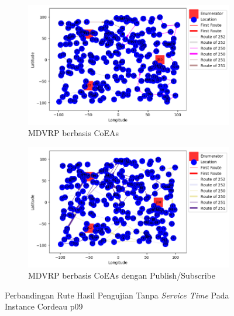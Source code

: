 \begin{figure}[H]
	\centering
	\begin{subfigure}[t]{\textwidth}
		\centering
		\includegraphics[width=\textwidth]{Resources/Images/cordeau_p09/cordeau_p09_notw_coes}
		\caption{MDVRP berbasis CoEAs}
		\label{fig:cordeau_p09_notw_coes}
	\end{subfigure}
	\begin{subfigure}[t]{\textwidth}
		\centering
		\includegraphics[width=\textwidth]{Resources/Images/cordeau_p09/cordeau_p09_notw_pubsub_coes}
		\caption{MDVRP berbasis CoEAs dengan Publish/Subscribe}
		\label{fig:cordeau_p09_notw_pubsub_coes}
	\end{subfigure}
	\caption{Perbandingan Rute Hasil Pengujian Tanpa \textit{Service Time} Pada Instance Cordeau p09}
	\label{fig:cordeau_p09_notw}
\end{figure}


